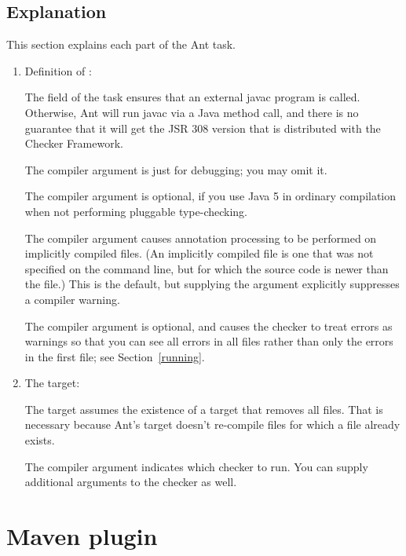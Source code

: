 \subsection{Explanation\label{ant-task-explanation}}

This section explains each part of the Ant task.

\begin{enumerate}
\item Definition of :

The  field of the  task
ensures that an external javac program is called.  Otherwise, Ant will run
javac via a Java method call, and there is no guarantee that it will get
the JSR 308 version that is distributed with the Checker Framework.

The  compiler argument is just for debugging; you may omit
it.

The  compiler argument is optional, if you use Java 5 in
ordinary compilation when not performing pluggable type-checking.

The  compiler argument causes annotation processing
to be performed on implicitly compiled files.  (An implicitly compiled file
is one that was not specified on the command line, but for which the source
code is newer than the  file.)  This is the default, but
supplying the argument explicitly suppresses a compiler warning.

The  compiler argument is optional, and causes the checker to
treat errors as warnings so that you can see all errors in all files rather
than only the errors in the first file; see Section~\ref{running}.

\item The  target:

The target assumes the existence of a  target that removes all
 files.  That is necessary because Ant's  target
doesn't re-compile  files for which a  file
already exists.

The  compiler argument indicates which checker to
run.  You can supply additional arguments to the checker as well.

\end{enumerate}


\section{Maven plugin\label{maven-plugin}}

